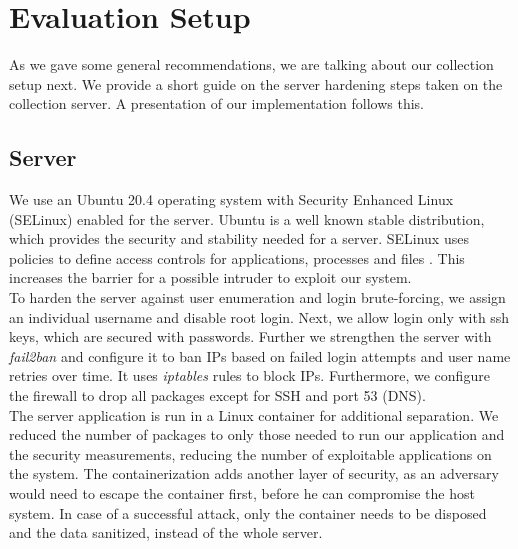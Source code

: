 \section{Evaluation Setup}
\label{sec:measurement:eval_setup}
%
    As we gave some general recommendations, we are talking about our collection setup next.
    We provide a short guide on the server hardening steps taken on the collection server. A presentation of our implementation follows this.
    
    \subsection{Server}
        \label{subsec:measure:server}
        We use an Ubuntu 20.4 operating system with Security Enhanced Linux (SELinux) \cite{noauthor_what_nodate-1} enabled for the server.
        Ubuntu is a well known stable distribution, which provides the security and stability needed for a server. SELinux uses policies to define access controls for applications, processes and files \cite{noauthor_what_nodate-1}. This increases the barrier for a possible intruder to exploit our system.\\
        
        To harden the server against user enumeration and login brute-forcing, we assign an individual username and disable root login. Next, we allow login only with ssh keys, which are secured with passwords.
        Further we strengthen the server with \textit{fail2ban} and configure it to ban IPs based on failed login attempts and user name retries over time. It uses \textit{iptables} rules to block IPs. Furthermore, we configure the firewall to drop all packages except for SSH and port 53 (DNS).\\
        
        The server application is run in a Linux container for additional separation. We reduced the number of packages to only those needed to run our application and the security measurements, reducing the number of exploitable applications on the system. The containerization adds another layer of security, as an adversary would need to escape the container first, before he can compromise the host system. In case of a successful attack, only the container needs to be disposed and the data sanitized, instead of the whole server.
        
